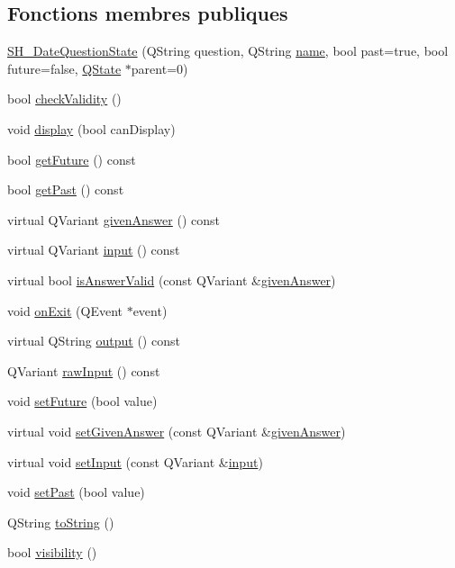 \subsection*{Fonctions membres publiques}
\begin{DoxyCompactItemize}
\item 
\hyperlink{classSH__DateQuestionState_a9a60060ebcd5994d62f0ca5f0e6b5e98}{S\-H\-\_\-\-Date\-Question\-State} (Q\-String question, Q\-String \hyperlink{classSH__NamedObject_a970f265df31b28b2179bbbceb6170ac2}{name}, bool past=true, bool future=false, \hyperlink{classQState}{Q\-State} $\ast$parent=0)
\item 
bool \hyperlink{classSH__QuestionState_a3ca5459c20ef591023c0572d8224146c}{check\-Validity} ()
\item 
void \hyperlink{classSH__InOutState_a918e8a7f5fe00dc16004e46eeee1281d}{display} (bool can\-Display)
\item 
bool \hyperlink{classSH__DateQuestionState_aa0ac7bfdd8528fdbc7b517d7f2f1fcc7}{get\-Future} () const 
\item 
bool \hyperlink{classSH__DateQuestionState_a13b9815a4c8b0f5bd78426efdc754b8c}{get\-Past} () const 
\item 
virtual Q\-Variant \hyperlink{classSH__QuestionState_abde97c61175be95358ece622fd16593e}{given\-Answer} () const 
\item 
virtual Q\-Variant \hyperlink{classSH__InOutState_a04364c76d2fd8a3781e7b325955e5bd9}{input} () const 
\item 
virtual bool \hyperlink{classSH__DateQuestionState_aacd24891431755fb857c17a864d39ba9}{is\-Answer\-Valid} (const Q\-Variant \&\hyperlink{classSH__QuestionState_abde97c61175be95358ece622fd16593e}{given\-Answer})
\item 
void \hyperlink{classSH__InOutState_a36636cba0d68476288bce5fd4c041db0}{on\-Exit} (Q\-Event $\ast$event)
\item 
virtual Q\-String \hyperlink{classSH__InOutState_a1a2fd4f34484125058e20730aaee7e46}{output} () const 
\item 
Q\-Variant \hyperlink{classSH__DateQuestionState_ac72e5b6b416614631032ff643d3c180e}{raw\-Input} () const 
\item 
void \hyperlink{classSH__DateQuestionState_ae160da14278cb25ce255f108f481d5eb}{set\-Future} (bool value)
\item 
virtual void \hyperlink{classSH__QuestionState_a9d285a34a7002fd05a7fa8ff9139c264}{set\-Given\-Answer} (const Q\-Variant \&\hyperlink{classSH__QuestionState_abde97c61175be95358ece622fd16593e}{given\-Answer})
\item 
virtual void \hyperlink{classSH__QuestionState_a331222d371d9c97392f35c84a5ef43e1}{set\-Input} (const Q\-Variant \&\hyperlink{classSH__InOutState_a04364c76d2fd8a3781e7b325955e5bd9}{input})
\item 
void \hyperlink{classSH__DateQuestionState_a06f77c3d6449354c0d1135cc9755dd41}{set\-Past} (bool value)
\item 
Q\-String \hyperlink{classSH__GenericState_a5480c5ee725fd801d8f6292cd4c803b8}{to\-String} ()
\item 
bool \hyperlink{classSH__InOutState_a8c496b2fe21a51a587c6e4409c0f37ec}{visibility} ()
\end{DoxyCompactItemize}
